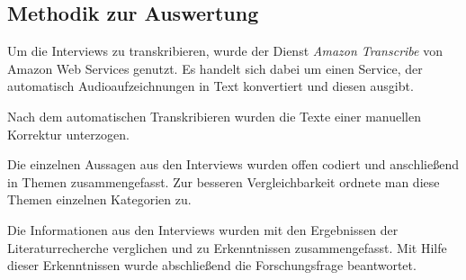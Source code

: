 \subsection{Methodik zur Auswertung}

Um die Interviews zu transkribieren, wurde der Dienst \textit{Amazon Transcribe} von Amazon Web Services genutzt. Es handelt sich dabei um einen Service, der automatisch Audioaufzeichnungen in Text konvertiert und diesen ausgibt.

Nach dem automatischen Transkribieren wurden die Texte einer manuellen Korrektur unterzogen.

Die einzelnen Aussagen aus den Interviews wurden offen codiert und anschließend in Themen zusammengefasst. Zur besseren Vergleichbarkeit ordnete man  diese Themen einzelnen Kategorien zu.

Die Informationen aus den Interviews wurden mit den Ergebnissen der Literaturrecherche verglichen und zu Erkenntnissen zusammengefasst. Mit Hilfe dieser Erkenntnissen wurde abschließend die Forschungsfrage beantwortet.
